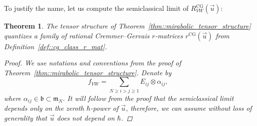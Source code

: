 \documentclass[pdftex]{sigma}
\numberwithin{equation}{section}
\newtheorem{Theorem}{Theorem}[section]
\newcommand{\CG}{\mathrm{CG}}
\renewcommand{\b}{\mathfrak{b}}
\newcommand{\m}{\mathfrak{m}}
\begin{document}
	To justify the name, let us compute the semiclassical limit of $R_{VW}^{\CG}(\vec{u})$:
	\begin{Theorem}
		\label{eq::cg_quantization}
		The tensor structure of Theorem~{\rm\ref{thm::mirabolic_tensor_structure}} quantizes a family of rational Cremmer--Gervais $r$-matrices $r^{\CG}(\vec{u})$ from Definition~{\rm\ref{def::cg_class_r_mat}}.
		\begin{proof}
			We use notations and conventions from the proof of Theorem~\ref{thm::mirabolic_tensor_structure}. Denote by
			\[
			f_{VW} = \sum\limits_{N \geq i > j \geq 1} E_{ij} \otimes \alpha_{ij},
			\]
			where $\alpha_{ij} \in \b \subset \m_N$. It will follow from the proof that the semiclassical limit depends only on the zeroth $\hbar$-power of $\vec{u}$, therefore, we can assume without loss of generality that $\vec{u}$ does not depend on $\hbar$.
			

\end{proof}
\end{Theorem}
\end{document}
